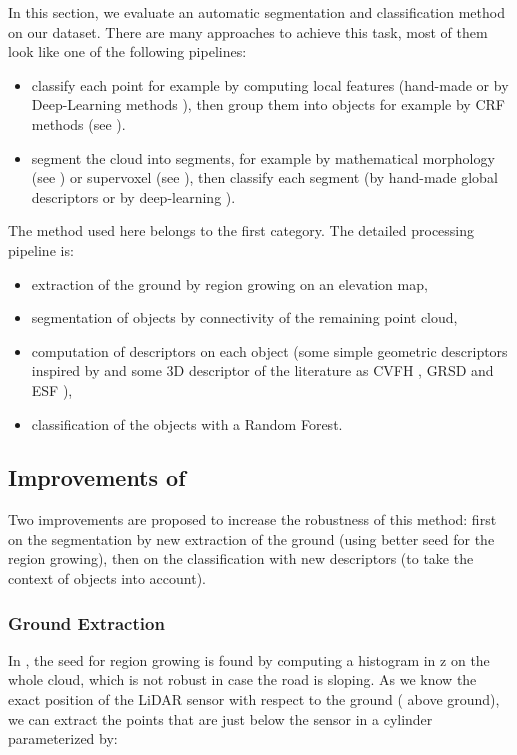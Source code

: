 \documentclass[a4paper, 10pt, journal]{article}
\begin{document}
In this section, we evaluate an automatic segmentation and classification method on our dataset. There are many approaches to achieve this task, most of them look like one of the following pipelines:
\begin{itemize}
 \item classify each point for example by computing local features (hand-made \cite{weinmann2015semantic} or by Deep-Learning methods \cite{huang2016point}), then group them into objects for example by CRF methods (see \cite{LANDRIEU2017102}).
 \item segment the cloud into segments, for example by mathematical morphology (see \cite{serna2014detection}) or supervoxel (see \cite{aijazi2013segmentation}), then classify each segment (by hand-made global descriptors \cite{johnson1999using,velizhev2012implicit} or by deep-learning \cite{maturana2015voxnet, qi2016pointnet}).
\end{itemize}
The method used here \cite{roynard2016fast} belongs to the first category. The detailed processing pipeline is:
\begin{itemize}
 \item extraction of the ground by region growing on an elevation map,
 \item segmentation of objects by connectivity of the remaining point cloud,
 \item computation of descriptors on each object (some simple geometric descriptors inspired by \cite{serna2014detection} and some 3D descriptor of the literature as CVFH \cite{rusu2010fast}, GRSD \cite{marton2010general} and ESF \cite{osada2001matching}), 
 \item classification of the objects with a Random Forest.
\end{itemize}

\subsection{Improvements of \cite{roynard2016fast}}

Two improvements are proposed to increase the robustness of this method: first on the segmentation by new extraction of the ground (using better seed for the region growing), then on the classification with new descriptors (to take the context of objects into account).

\subsubsection{Ground Extraction}
In \cite{roynard2016fast}, the seed for region growing is found by computing a histogram in z on the whole cloud, which is not robust in case the road is sloping.
As we know the exact position of the LiDAR sensor with respect to the ground ( above ground), we can extract the points that are just below the sensor in a cylinder parameterized by:
\end{document}
